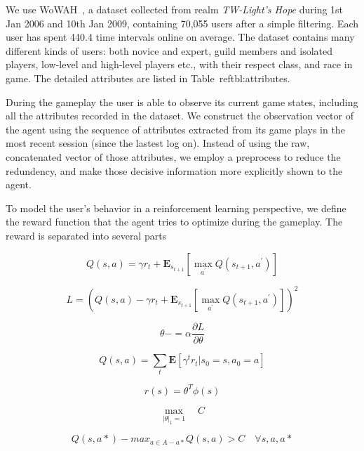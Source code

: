 \documentclass[a4paper]{article}
\begin{document}
We use WoWAH~\cite{}, a dataset collected from realm \textit{TW-Light's Hope} during 1st Jan 2006 and 10th Jan 2009, containing 70,055 users after a simple filtering. Each user has spent 440.4 time intervals online on average. The dataset contains many different kinds of users: both novice and expert, guild members and isolated players, low-level and high-level players etc., with their respect class, and race in game. The detailed attributes are listed in Table~ref{tbl:attributes}.

During the gameplay the user is able to observe its current game states, including all the attributes recorded in the dataset. We construct the observation vector of the agent using the sequence of attributes extracted from its game plays in the most recent session (since the lastest log on). Instead of using the raw, concatenated vector of those attributes, we employ a preprocess to reduce the redundency, and make those decisive information more explicitly shown to the agent.

To model the user's behavior in a reinforcement learning perspective, we define the reward function that the agent tries to optimize during the gameplay. The reward is separated into several parts




$$Q(s,a)=\gamma r_{t} + \mathbf{E}_{s_{t+1}}[\max_{a^\prime}Q(s_{t+1}, a^\prime)]$$

$$L=(Q(s,a)-\gamma r_{t} + \mathbf{E}_{s_{t+1}}[\max_{a^\prime}Q(s_{t+1}, a^\prime)])^2$$

$$\theta -= \alpha\frac{\partial L}{\partial \theta}$$

$$Q(s,a)=\sum_{t}\mathbf{E}[\gamma^{t}r_{t} | s_{0}=s, a_{0}=a]$$

$$ r(s)=\theta^T \phi(s)$$

$$ \max_{|\theta|_1=1} \quad C$$

$$ Q(s,a*) - max_{a\in A-a*}Q(s,a) > C \quad\forall s,a,a*$$
\end{document}
